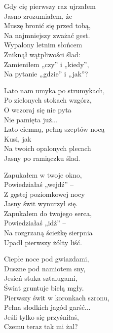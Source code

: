 \begin{text}
Gdy cię pierwszy raz ujrzałem\\
Jasno zrozumiałem, że\\
Muszę bronić się przed tobą,\\
Na najmniejszy zważać gest.\\
Wypalony letnim słońcem\\
Zniknął wątpliwości ślad:\\
Zamieniłem „czy” i „kiedy”,\\
Na pytanie „gdzie” i „jak”?

\vin Lato nam umyka po strumykach,\\
\vin Po zielonych stokach wzgórz,\\
\vin O wczoraj się nie pyta\\
\vin Nie pamięta już...\\
\vin Lato ciemną, pełną szeptów nocą\\
\vin Kusi, jak\\
\vin Na twoich opalonych plecach\\
\vin Jasny po ramiączku ślad.

Zapukałem w twoje okno,\\
Powiedziałaś „wejdź” –\\
Z gęstej poziomkowej nocy\\
Jasny świt wynurzył się.\\
Zapukałem do twojego serca,\\
Powiedziałaś „idź” –\\
Na rozgrzaną ścieżkę sierpnia\\
Upadł pierwszy żółty liść.

Ciepłe noce pod gwiazdami,\\
Duszne pod namiotem sny,\\
Jesień stuka sztalugami,\\
Świat gruntuje bielą mgły.\\
Pierwszy świt w koronkach szronu,\\
Pełna słodkich jagód garść...\\
Jeśli tylko się przyśniłaś,\\
Czemu teraz tak mi żal?
\end{text}
